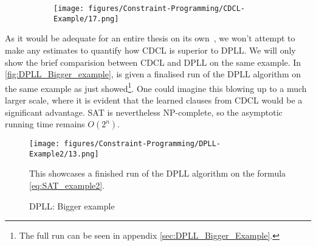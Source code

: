 \begin{figure}[H]
    \centering
    \begin{subfigure}[t]{0.48\textwidth}
        \centering
        \texttt{[image: figures/Constraint-Programming/CDCL-Example/17.png]}
    \end{subfigure}
\end{figure}

As it would be adequate for an entire thesis on its own~\cite{All-SAT-Solvers}, we won't attempt to make any estimates to quantify how CDCL is superior to DPLL. We will only show the brief comparision between CDCL and DPLL on the same example. In \autoref{fig:DPLL_Bigger_example}, is given a finalised run of the DPLL algorithm on the same example as just showed\footnote{The full run can be seen in appendix \autoref{sec:DPLL_Bigger_Example}.}. One could imagine this blowing up to a much larger scale, where it is evident that the learned clauses from CDCL would be a significant advantage. SAT is nevertheless NP-complete, so the asymptotic running time remains \(O(2^n)\).  

\begin{figure}[H]
    \centering
    \texttt{[image: figures/Constraint-Programming/DPLL-Example2/13.png]}
    \caption{DPLL: Bigger example}
    \small
    \raggedright 
    This showcases a finished run of the DPLL algorithm on the formula \autoref{eq:SAT_example2}.
    \label{fig:DPLL_Bigger_example}
\end{figure}

